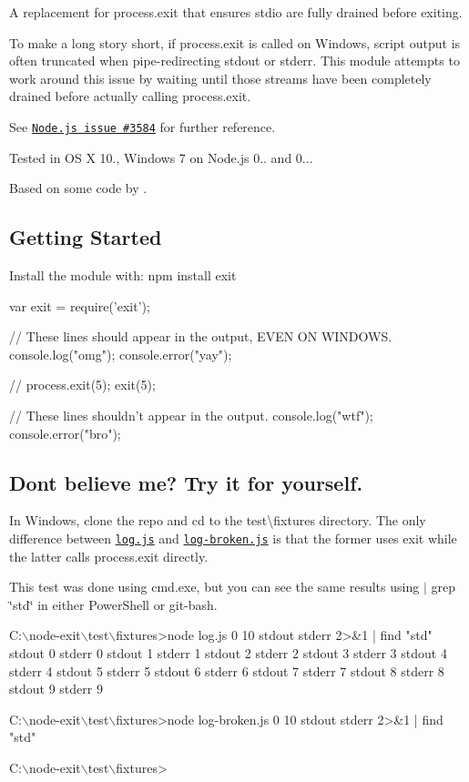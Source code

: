 A replacement for process.\+exit that ensures stdio are fully drained before exiting.

To make a long story short, if {\ttfamily process.\+exit} is called on Windows, script output is often truncated when pipe-\/redirecting {\ttfamily stdout} or {\ttfamily stderr}. This module attempts to work around this issue by waiting until those streams have been completely drained before actually calling {\ttfamily process.\+exit}.

See \href{https://github.com/joyent/node/issues/3584}{\tt Node.\+js issue \#3584} for further reference.

Tested in OS X 10., Windows 7 on Node.\+js 0.. and 0...

Based on some code by \href{https://github.com/vladikoff}{\tt }.

\subsection*{Getting Started}

Install the module with\+: {\ttfamily npm install exit}


\begin{DoxyCode}
var exit = require('exit');

// These lines should appear in the output, EVEN ON WINDOWS.
console.log("omg");
console.error("yay");

// process.exit(5);
exit(5);

// These lines shouldn't appear in the output.
console.log("wtf");
console.error("bro");
\end{DoxyCode}


\subsection*{Don\textquotesingle{}t believe me? Try it for yourself.}

In Windows, clone the repo and cd to the {\ttfamily test\textbackslash{}fixtures} directory. The only difference between \href{test/fixtures/log.js}{\tt log.\+js} and \href{test/fixtures/log-broken.js}{\tt log-\/broken.\+js} is that the former uses {\ttfamily exit} while the latter calls {\ttfamily process.\+exit} directly.

This test was done using cmd.\+exe, but you can see the same results using {\ttfamily $\vert$ grep \char`\"{}std\char`\"{}} in either Power\+Shell or git-\/bash.


\begin{DoxyCode}
C:\(\backslash\)node-exit\(\backslash\)test\(\backslash\)fixtures>node log.js 0 10 stdout stderr 2>&1 | find "std"
stdout 0
stderr 0
stdout 1
stderr 1
stdout 2
stderr 2
stdout 3
stderr 3
stdout 4
stderr 4
stdout 5
stderr 5
stdout 6
stderr 6
stdout 7
stderr 7
stdout 8
stderr 8
stdout 9
stderr 9

C:\(\backslash\)node-exit\(\backslash\)test\(\backslash\)fixtures>node log-broken.js 0 10 stdout stderr 2>&1 | find "std"

C:\(\backslash\)node-exit\(\backslash\)test\(\backslash\)fixtures>
\end{DoxyCode}


